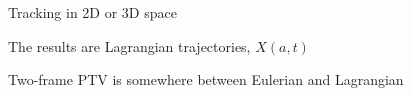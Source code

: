 \begin{frame}[label=ptv-12]{Tracking in 2D or 3D space}

\centering {}


\end{frame}





			

\begin{frame}[label=ptv-15]{The results are Lagrangian trajectories, $X(a,t)$}
    \centering
\end{frame}


\begin{frame}[label=ptv-16]{Two-frame PTV is somewhere between Eulerian and Lagrangian}
    \centering{}
\end{frame}


